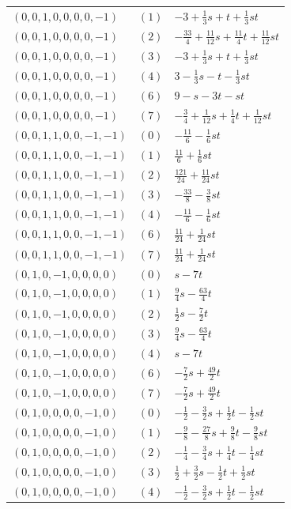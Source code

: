 \begin{longtable}{@{}lll@{}}
$(0,0,1,0,0,0,0,-1)$ & $(1)$ & $-3+\frac{1}{3}s+t+\frac{1}{3}st$\\
$(0,0,1,0,0,0,0,-1)$ & $(2)$ & $-\frac{33}{4}+\frac{11}{12}s+\frac{11}{4}t+\frac{11}{12}st$\\
$(0,0,1,0,0,0,0,-1)$ & $(3)$ & $-3+\frac{1}{3}s+t+\frac{1}{3}st$\\
$(0,0,1,0,0,0,0,-1)$ & $(4)$ & $3-\frac{1}{3}s-t-\frac{1}{3}st$\\
$(0,0,1,0,0,0,0,-1)$ & $(6)$ & $9-s-3t-st$\\
$(0,0,1,0,0,0,0,-1)$ & $(7)$ & $-\frac{3}{4}+\frac{1}{12}s+\frac{1}{4}t+\frac{1}{12}st$\\
$(0,0,1,1,0,0,-1,-1)$ & $(0)$ & $-\frac{11}{6}-\frac{1}{6}st$\\
$(0,0,1,1,0,0,-1,-1)$ & $(1)$ & $\frac{11}{6}+\frac{1}{6}st$\\
$(0,0,1,1,0,0,-1,-1)$ & $(2)$ & $\frac{121}{24}+\frac{11}{24}st$\\
$(0,0,1,1,0,0,-1,-1)$ & $(3)$ & $-\frac{33}{8}-\frac{3}{8}st$\\
$(0,0,1,1,0,0,-1,-1)$ & $(4)$ & $-\frac{11}{6}-\frac{1}{6}st$\\
$(0,0,1,1,0,0,-1,-1)$ & $(6)$ & $\frac{11}{24}+\frac{1}{24}st$\\
$(0,0,1,1,0,0,-1,-1)$ & $(7)$ & $\frac{11}{24}+\frac{1}{24}st$\\
$(0,1,0,-1,0,0,0,0)$ & $(0)$ & $s-7t$\\
$(0,1,0,-1,0,0,0,0)$ & $(1)$ & $\frac{9}{4}s-\frac{63}{4}t$\\
$(0,1,0,-1,0,0,0,0)$ & $(2)$ & $\frac{1}{2}s-\frac{7}{2}t$\\
$(0,1,0,-1,0,0,0,0)$ & $(3)$ & $\frac{9}{4}s-\frac{63}{4}t$\\
$(0,1,0,-1,0,0,0,0)$ & $(4)$ & $s-7t$\\
$(0,1,0,-1,0,0,0,0)$ & $(6)$ & $-\frac{7}{2}s+\frac{49}{2}t$\\
$(0,1,0,-1,0,0,0,0)$ & $(7)$ & $-\frac{7}{2}s+\frac{49}{2}t$\\
$(0,1,0,0,0,0,-1,0)$ & $(0)$ & $-\frac{1}{2}-\frac{3}{2}s+\frac{1}{2}t-\frac{1}{2}st$\\
$(0,1,0,0,0,0,-1,0)$ & $(1)$ & $-\frac{9}{8}-\frac{27}{8}s+\frac{9}{8}t-\frac{9}{8}st$\\
$(0,1,0,0,0,0,-1,0)$ & $(2)$ & $-\frac{1}{4}-\frac{3}{4}s+\frac{1}{4}t-\frac{1}{4}st$\\
$(0,1,0,0,0,0,-1,0)$ & $(3)$ & $\frac{1}{2}+\frac{3}{2}s-\frac{1}{2}t+\frac{1}{2}st$\\
$(0,1,0,0,0,0,-1,0)$ & $(4)$ & $-\frac{1}{2}-\frac{3}{2}s+\frac{1}{2}t-\frac{1}{2}st$\\

\end{longtable}
